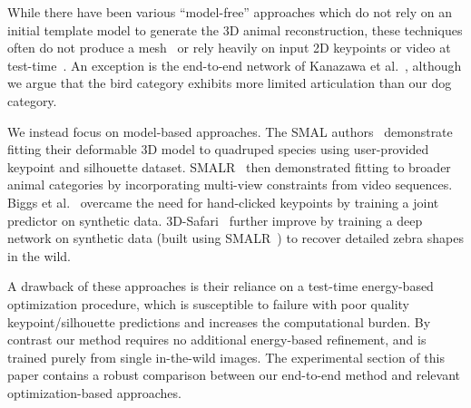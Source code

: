 While there have been various ``model-free'' approaches which do not rely on an initial template model to generate the 3D animal reconstruction, these techniques often do not produce a mesh~\cite{Agudo_2018_CVPR,novotny19c3dpo} or rely heavily on input 2D keypoints or video at test-time~\cite{vicente_3dv,Probst2018_ECCVa}. An exception is the end-to-end network of Kanazawa et al.~\cite{kanazawa2018birds}, although we argue that the bird category exhibits more limited articulation than our dog category.

We instead focus on model-based approaches. The SMAL authors~\cite{zuffi2017menagerie} demonstrate fitting their deformable 3D model to quadruped species using user-provided keypoint and silhouette dataset. SMALR~\cite{zuffi_lions} then demonstrated fitting to broader animal categories by incorporating multi-view constraints from video sequences. Biggs et al.~\cite{biggs2018creatures} overcame the need for hand-clicked keypoints by training a joint predictor on synthetic data. 3D-Safari~\cite{Zuffi19Safari} further improve by training a deep network on synthetic data (built using SMALR~\cite{zuffi_lions}) to recover detailed zebra shapes in the wild.

A drawback of these approaches is their reliance on a test-time energy-based optimization procedure, which is susceptible to failure with poor quality keypoint/silhouette predictions and increases the computational burden. By contrast our method requires no additional energy-based refinement, and is trained purely from single in-the-wild images. The experimental section of this paper contains a robust comparison between our end-to-end method and relevant optimization-based approaches. 


